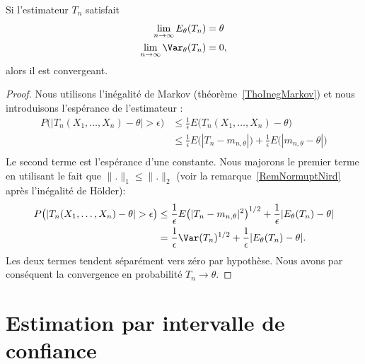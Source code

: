 \begin{lemma}
    Si l'estimateur \( T_n\) satisfait
    \begin{subequations}
        \begin{align}
            \lim_{n\to \infty} E_{\theta}(T_n)&=\theta\\
            \lim_{n\to \infty} \Var_{\theta}(T_n)&=0,
        \end{align}
    \end{subequations}
    alors il est convergeant.
\end{lemma}

\begin{proof}
    Nous utilisons l'inégalité de Markov (théorème~\ref{ThoInegMarkov}) et nous introduisons l'espérance de l'estimateur :
    \begin{subequations}
        \begin{align}
            P\big( | T_n(X_1,\ldots ,X_n)-\theta |>\epsilon \big)&\leq\frac{1}{ \epsilon }E\big( T_n(X_1,\ldots,X_n)-\theta \big)\\
            &\leq \frac{1}{ \epsilon }E\big( | T_n-m_{n,\theta} | \big)+\frac{1}{ \epsilon }E\big(| m_{n,\theta}-\theta |\big)\\
        \end{align}
    \end{subequations}
    Le second terme est l'espérance d'une constante. Nous majorons le premier terme en utilisant le fait que \( \| . \|_1\leq\| . \|_2\) (voir la remarque~\ref{RemNormuptNird} après l'inégalité de Hölder):
    \begin{subequations}
        \begin{align}
            P\big( | T_n(X_1,\ldots ,X_n)-\theta |>\epsilon \big)&\leq \frac{1}{ \epsilon }E\big( | T_n-m_{n,\theta} |^2 \big)^{1/2}+\frac{1}{ \epsilon }| E_{\theta}(T_n)-\theta |\\
            &=\frac{1}{ \epsilon }\Var(T_n)^{1/2}+\frac{1}{ \epsilon }| E_{\theta}(T_n)-\theta |.
        \end{align}
    \end{subequations}
    Les deux termes tendent séparément vers zéro par hypothèse. Nous avons par conséquent la convergence en probabilité \( T_n\to \theta\).
\end{proof}

\section{Estimation par intervalle de confiance}

